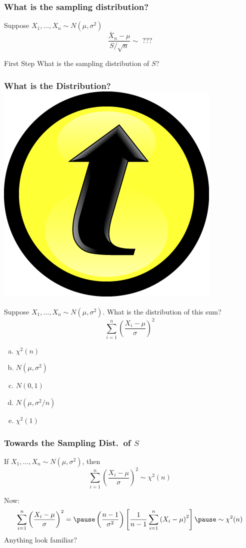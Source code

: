\documentclass[handout]{beamer}
\begin{document}
\begin{frame}
\frametitle{What is the sampling distribution?}
Suppose $X_1, \hdots, X_n \sim N(\mu,\sigma^2)$
 $$\boxed{\frac{\bar{X}_n-\mu}{S/\sqrt{n}}  \sim \mbox{ ???}}$$

 \begin{block}{First Step}
What is the sampling distribution of $S$?
\end{block}
\end{frame}
\begin{frame}
\frametitle{What is the Distribution? \hfill \includegraphics[scale = 0.05]{./images/clicker}}
Suppose $X_1, \hdots, X_n \sim N(\mu,\sigma^2)$. What is the distribution of this sum?
	$$\sum_{i=1}^n \left(\frac{X_i - \mu}{\sigma}\right)^2$$
	
	\begin{enumerate}[(a)]
\item $\chi^2(n)$
\item $N(\mu, \sigma^2)$
\item $N(0,1)$
\item $N(\mu, \sigma^2/n)$
\item $\chi^2(1)$
\end{enumerate}
\end{frame}
\begin{frame}
\frametitle{Towards the Sampling Dist.\ of $S$}
If $X_1, \hdots, X_n \sim N(\mu,\sigma^2)$, then 
$$\sum_{i=1}^n \left(\frac{X_i - \mu}{\sigma}\right)^2 \sim \chi^2(n)$$

Now:
$$\sum_{i=1}^n \left(\frac{X_i - \mu}{\sigma}\right)^2   = \pause \left(\frac{n-1}{\sigma^2}\right) \left[\frac{1}{n-1}\sum_{i=1}^n \left(X_i - \mu\right)^2\right] \pause \sim \chi^2(n) $$
\alert{Anything look familiar?}
\end{frame}
\end{document}
